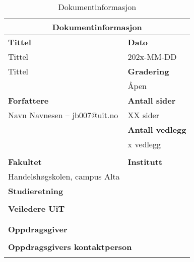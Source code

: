 \begin{table}[]
\begin{tabular}{|p{}|p{}|}
    \hline
    \multicolumn{2}{|c|}{\textbf{Dokumentinformasjon}} \\ \hline
        \textbf{Tittel} & \textbf{Dato}      \\
        Tittel   & 202x-MM-DD      \\         
        Tittel  &   \textbf{Gradering}       \\     
        & Åpen           \\ \hline
        \textbf{Forfattere} & \textbf{Antall sider} \\
       Navn Navnesen – jb007@uit.no          & XX sider   \\
                & \textbf{Antall vedlegg} \\
                & x vedlegg \\
                & \\ \hline
        \textbf{Fakultet} & \textbf{Institutt} \\
        Handelshøgskolen, campus Alta &   \\ \hline
        \multicolumn{2}{|l|}{\textbf{Studieretning}} \\
        \multicolumn{2}{|l|}{}  \\ \hline
        \multicolumn{2}{|l|}{\textbf{Veiledere UiT}} \\
        \multicolumn{2}{|l|}{} \\
        \multicolumn{2}{|l|}{}\\ \hline
        \multicolumn{2}{|l|}{\textbf{Oppdragsgiver}} \\ 
        \multicolumn{2}{|l|}{}  \\ \hline
        \multicolumn{2}{|l|}{\textbf{Oppdragsgivers kontaktperson}}  \\
        \multicolumn{2}{|l|}{} \\ \hline
    \end{tabular}
\caption{Dokumentinformasjon}
\end{table}
